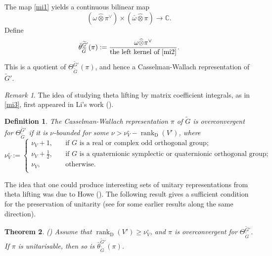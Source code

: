 \documentclass[lang = american]{ems-icm} %
\newcommand{\rank}{\operatorname{rank}}
\newcommand{\rD}{\mathrm D}
\numberwithin{equation}{section}
\newtheorem{thm}{Theorem}[section]
\newtheorem{defn}[thm]{Definition}
\theoremstyle{remark}
\newtheorem*{remark}{Remark}
\begin{document}
The map \eqref{mi1} yields a continuous bilinear map
 \begin{equation}\label{mi2}
(\omega\widehat \otimes \pi^\vee) \times ( \bar \omega\widehat \otimes \pi)
   \rightarrow \mathbb C.
 \end{equation}
Define
\begin{equation}\label{mi3}
  \bar \theta_{\widetilde G}^{\widetilde G'}(\pi):=\frac{\omega\widehat \otimes \pi^\vee}{\textrm{the left kernel of \eqref{mi2}}}.
\end{equation}
This is a quotient of $\Theta_{\widetilde G}^{\widetilde G'}(\pi)$, and hence a Casselman-Wallach representation of $\widetilde G'$.


\begin{remark} The idea of studying theta lifting by matrix coefficient integrals, as in \cref{mi3}, first appeared in Li's work (\cites{Li1,Li2}).
\end{remark}


\begin{defn}\label{defn:OVcov}
The Casselman-Wallach representation $\pi$ of $\widetilde{G}$ is overconvergent for $\Theta_{\widetilde G}^{\widetilde G'}$ if it is $\nu$-bounded for some $\nu>\nu^{\circ}_{V}-\rank_{\rD}(V')$, where
\[
  \nu^{\circ}_{V}:=\begin{cases}
         \nu_{V}+1,\quad & \textrm{if $G$ is a real or complex odd orthogonal group};\\
         \nu_{V}+\frac{1}{2},\quad & \textrm{if $G$ is a quaternionic symplectic or quaternionic orthogonal group};\\
      \nu_{V} ,\quad &\textrm{otherwise}.\\
  \end{cases}
\]
\end{defn}


The idea that one could produce interesting sets of unitary representations from theta lifting was due to Howe (\cite{HoSmall}).
The following result gives a sufficient condition for the preservation of unitarity (see \cites{Li1, Li2, He1, He2} for some earlier results along the same direction).

\begin{thm}\label{positivity} \emph{(\cite{BMSZ3})}
Assume that $\rank_{\rD}(V')\geq \nu^\circ_{V}$, and $\pi$ is overconvergent for $\Theta_{\widetilde G}^{\widetilde G'}$.
If $\pi $ is unitarisable, then so is $\bar \theta_{\widetilde G}^{\widetilde G'}(\pi)$.
\end{thm}
\end{document}
